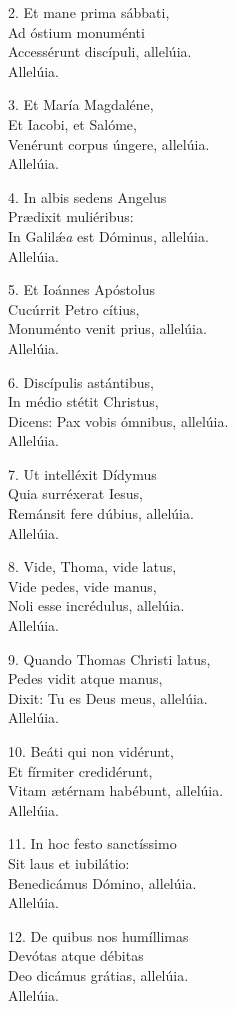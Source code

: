 \begin{multicols}{2}
\setlength{\parskip}{0.5em}
	2. Et mane prima sábbati,\\
	Ad óstium monuménti\\
	Accessérunt discípuli, allelúia.\\
	\R Allelúia.

	3. Et María Magdaléne,\\
	Et Iacobi, et Salóme,\\
	Venérunt corpus úngere, allelúia.\\
	\R Allelúia.

	4. In albis sedens Angelus\\
	Pr\ae{}dixit muliéribus:\\
	In Galil\'{\ae}{\it a} est Dóminus, allelúia.\\
	\R Allelúia.

	5. Et Ioánnes Apóstolus\\
	Cucúrrit Petro cítius,\\
	Monuménto venit prius, allelúia.\\
	\R Allelúia.

	6. Discípulis astántibus,\\
	In médio stétit Christus,\\
	Dicens: Pax vobis ómnibus, allelúia.\\
	\R Allelúia.

	7. Ut intelléxit Dídymus\\
	Quia surréxerat Iesus,\\
	Remánsit fere dúbius, allelúia.\\
	\R Allelúia.

	\columnbreak

	8. Vide, Thoma, vide latus,\\
	Vide pedes, vide manus,\\
	Noli esse incrédulus, allelúia.\\
	\R Allelúia.

	9. Quando Thomas Christi latus,\\
	Pedes vidit atque manus,\\
	Dixit: Tu es Deus meus, allelúia.\\
	\R Allelúia.

	10. Beáti qui non vidérunt,\\
	Et fírmiter credidérunt,\\
	Vitam \ae{}térnam habébunt, allelúia.\\
	\R Allelúia.

	11. In hoc festo sanctíssimo\\
	Sit laus et iubilátio:\\
	{\sc Benedicámus Dómino}, allelúia.\\
	\R Allelúia.

	12. De quibus nos humíllimas\\
	Devótas atque débitas\\
	{\sc Deo} dicámus {\sc grátias}, allelúia.\\
	\R Allelúia.
\end{multicols}
